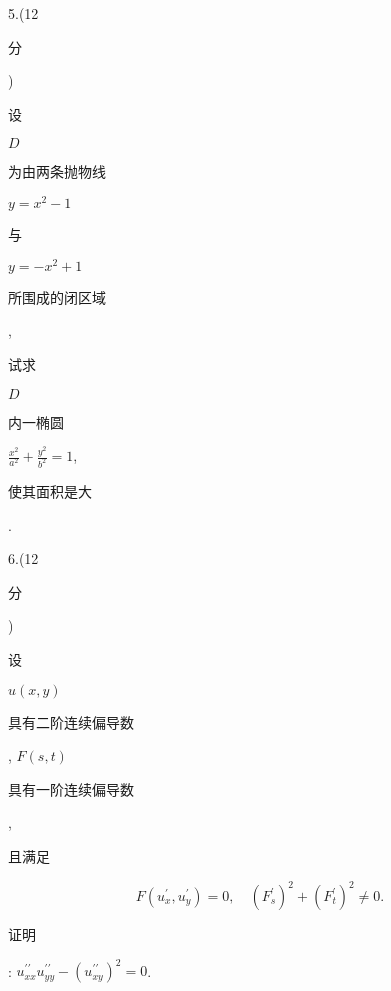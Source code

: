 \documentclass[10pt]{article}
\begin{document}
5.(12 \begin{CJK}{UTF8}{mj}分\end{CJK}) \begin{CJK}{UTF8}{mj}设\end{CJK} $D$ \begin{CJK}{UTF8}{mj}为由两条抛物线\end{CJK} $y=x^{2}-1$ \begin{CJK}{UTF8}{mj}与\end{CJK} $y=-x^{2}+1$ \begin{CJK}{UTF8}{mj}所围成的闭区域\end{CJK}, \begin{CJK}{UTF8}{mj}试求\end{CJK} $D$ \begin{CJK}{UTF8}{mj}内一椭圆\end{CJK} $\frac{x^{2}}{a^{2}}+\frac{y^{2}}{b^{2}}=1$, \begin{CJK}{UTF8}{mj}使其面积是大\end{CJK}.

6.(12 \begin{CJK}{UTF8}{mj}分\end{CJK}) \begin{CJK}{UTF8}{mj}设\end{CJK} $u(x, y)$ \begin{CJK}{UTF8}{mj}具有二阶连续偏导数\end{CJK}, $F(s, t)$ \begin{CJK}{UTF8}{mj}具有一阶连续偏导数\end{CJK}, \begin{CJK}{UTF8}{mj}且满足\end{CJK}
$$
F\left(u_{x}^{\prime}, u_{y}^{\prime}\right)=0, \quad\left(F_{s}^{\prime}\right)^{2}+\left(F_{t}^{\prime}\right)^{2} \neq 0 .
$$
\begin{CJK}{UTF8}{mj}证明\end{CJK}: $u_{x x}^{\prime \prime} u_{y y}^{\prime \prime}-\left(u_{x y}^{\prime \prime}\right)^{2}=0$.
\end{document}
